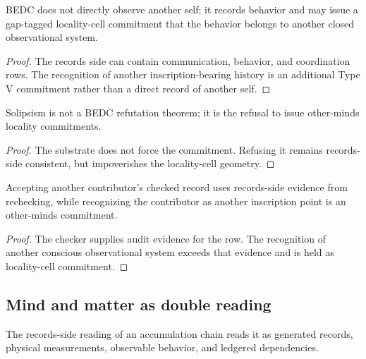 \begin{theorem}
\label{thm:philosophy-other-minds-locality-cell-commitments}
BEDC does not directly observe another self; it records behavior and
may issue a gap-tagged locality-cell commitment that the behavior
belongs to another closed observational system.
\end{theorem}
\begin{proof}
The records side can contain communication, behavior, and coordination
rows. The recognition of another inscription-bearing history is an
additional Type V commitment rather than a direct record of another
self.
\end{proof}

\begin{corollary}
\label{cor:philosophy-solipsism-commitment-refusal}
Solipsism is not a BEDC refutation theorem; it is the refusal to issue
other-minds locality commitments.
\end{corollary}
\begin{proof}
The substrate does not force the commitment. Refusing it remains
records-side consistent, but impoverishes the locality-cell geometry.
\end{proof}

\begin{corollary}
\label{cor:philosophy-collaboration-other-minds-commitment}
Accepting another contributor's checked record uses records-side
evidence from rechecking, while recognizing the contributor as another
inscription point is an other-minds commitment.
\end{corollary}
\begin{proof}
The checker supplies audit evidence for the row. The recognition of
another conscious observational system exceeds that evidence and is
held as locality-cell commitment.
\end{proof}

\subsection{Mind and matter as double reading}
\label{subsec:philosophy-mind-matter-double-reading}

\begin{definition}
\label{def:philosophy-records-side}
The records-side reading of an accumulation chain reads it as
generated records, physical measurements, observable behavior, and
ledgered dependencies.
\end{definition}

